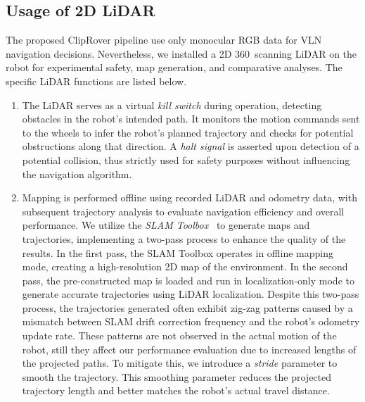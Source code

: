 \subsection{Usage of 2D LiDAR}\label{sec:LiDAR}
The proposed ClipRover pipeline use only monocular RGB data for VLN navigation decisions. Nevertheless, we installed a 2D $360$\degree\ scanning LiDAR on the robot for experimental safety, map generation, and comparative analyses. The specific LiDAR functions are listed below.
\begin{enumerate}[label={$\arabic*$.},nolistsep,leftmargin=*]
\item  {} The LiDAR serves as a virtual \textit{kill switch} during operation, detecting obstacles in the robot’s intended path. It monitors the motion commands sent to the wheels to infer the robot’s planned trajectory and checks for potential obstructions along that direction.  A {\textit{halt signal}} is asserted upon detection of a potential collision, thus strictly used for safety purposes without influencing the navigation algorithm. 

\item  {} Mapping is performed offline using recorded LiDAR and odometry data, with subsequent trajectory analysis to evaluate navigation efficiency and overall performance. We utilize the \textit{SLAM Toolbox}~\cite{Macenski2021} to generate maps and trajectories, implementing a two-pass process to enhance the quality of the results. In the first pass, the SLAM Toolbox operates in offline mapping mode, creating a high-resolution 2D map of the environment. In the second pass, the pre-constructed map is loaded and run in localization-only mode to generate accurate trajectories using LiDAR localization.
Despite this two-pass process, the trajectories generated often exhibit zig-zag patterns caused by a mismatch between SLAM drift correction frequency and the robot's odometry update rate. These patterns are not observed in the actual motion of the robot, still they affect our performance evaluation due to increased lengths of the projected paths. To mitigate this, we introduce a \textit{stride} parameter to smooth the trajectory. This smoothing parameter reduces the projected trajectory length and better matches the robot's actual travel distance.


\end{enumerate}
